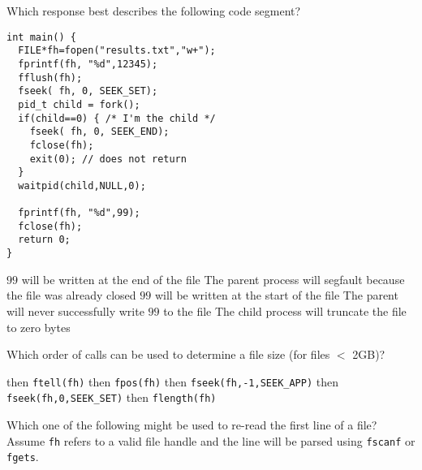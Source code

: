 \variant
Which response best describes the following code segment?
\begin{verbatim}
int main() {
  FILE*fh=fopen("results.txt","w+");
  fprintf(fh, "%d",12345);
  fflush(fh);
  fseek( fh, 0, SEEK_SET);
  pid_t child = fork();
  if(child==0) { /* I'm the child */
    fseek( fh, 0, SEEK_END);
    fclose(fh); 
    exit(0); // does not return
  }
  waitpid(child,NULL,0);

  fprintf(fh, "%d",99);
  fclose(fh);
  return 0;
}

\end{verbatim}
\begin{answers}
\correctanswer $99$ will be written at the end of the file
\answer The parent process will segfault because the file was already closed
\answer $99$ will be written at the start of the file
\answer The parent will never successfully write $99$ to the file
\answer The child process will truncate the file to zero bytes
\end{answers}
\begin{solution}
\end{solution}




\variant
Which order of calls can be used to determine a file size (for files $<$ 2GB)?
\begin{answers}
 then {\tt ftell(fh)}
 then {\tt fpos(fh)}
 then {\tt fseek(fh,-1,SEEK_APP)}
 then {\tt fseek(fh,0,SEEK_SET)}
 then {\tt flength(fh)} 
\end{answers}
\begin{solution}
\end{solution}


\variant
Which one of the following might be used to re-read the first line of a file? Assume {\tt fh} refers to a valid file handle and the line will be parsed using {\tt fscanf} or {\tt fgets}.
\begin{answers}
\end{answers}
\begin{solution}
\end{solution}



